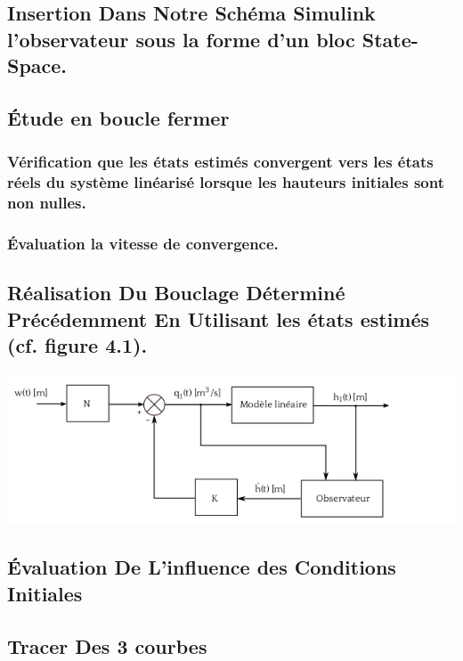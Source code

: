  
 
 \subsection{Insertion Dans Notre  Schéma Simulink l’observateur sous la forme d’un bloc State-Space.}
 
 
 \subsection{Étude en boucle fermer  }
  \subsubsection{ Vérification que les états estimés convergent vers les états réels du système linéarisé
lorsque les hauteurs initiales sont non nulles.}
  \subsubsection{Évaluation la vitesse de convergence.}
  
  
 \subsection{Réalisation Du Bouclage Déterminé Précédemment En Utilisant les états estimés (cf. figure 4.1).} 
 
\begin{center}
\includegraphics[scale=0.5]{fig3.png}
\label{fig3} 
\end{center}
 
 
 \subsection{Évaluation De  L’influence des Conditions Initiales}
 
 
 \subsection{Tracer  Des 3 courbes}
